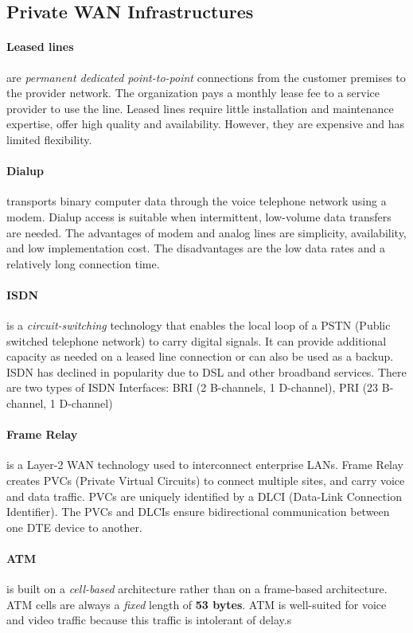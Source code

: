 \subsection{Private WAN Infrastructures}

\paragraph{Leased lines} are \emph{permanent dedicated point-to-point} connections from the customer premises to the provider network. The organization pays a monthly lease fee to a service provider to use the line. Leased lines require little installation and maintenance expertise, offer high quality and availability. However, they are expensive and has limited flexibility.

\paragraph{Dialup}transports binary computer data through the voice telephone network using a modem. Dialup access is suitable when intermittent, low-volume data transfers are needed. The advantages of modem and analog lines are simplicity, availability, and low implementation cost. The disadvantages are the low data rates and a relatively long connection time. 

\paragraph{ISDN}is a \emph{circuit-switching} technology that enables the local loop of a PSTN (Public switched telephone network) to carry digital signals. It can provide additional capacity as needed on a leased line connection or can also be used as a backup. ISDN has declined in popularity due to DSL and other broadband services. There are two types of ISDN Interfaces: BRI (2 B-channels, 1 D-channel), PRI (23 B-channel, 1 D-channel)

\paragraph{Frame Relay}is a Layer-2 WAN technology used to interconnect enterprise LANs. Frame Relay creates PVCs (Private Virtual Circuits) to connect multiple sites, and carry voice and data traffic. PVCs are uniquely identified by a DLCI (Data-Link Connection Identifier). The PVCs and DLCIs ensure bidirectional communication between one DTE device to another.

\paragraph{ATM} is built on a \emph{cell-based} architecture rather than on a frame-based architecture. ATM cells are always a \emph{fixed} length of \textbf{53 bytes}. ATM is well-suited for voice and video traffic because this traffic is intolerant of delay.s

